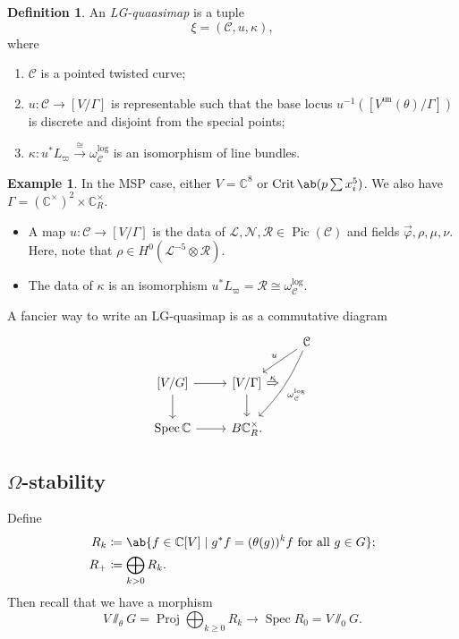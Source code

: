 \documentclass[10pt]{amsart}
\theoremstyle{definition}
\newtheorem{defn}[thm]{Definition}
\newtheorem{exm}[thm]{Example}
\theoremstyle{remark}
\theoremstyle{plain}
\theoremstyle{definition}
\theoremstyle{remark}
\newcommand{\C}{\mathbb{C}}
\newcommand{\mc}[1]{\mathcal{#1}}
\newcommand{\mr}[1]{\mathrm{#1}}
\newcommand{\on}[1]{\operatorname{#1}}
\newcommand{\1}{\mathbf{1}}
\newcommand{\2}{\mathbf{2}}
\newcommand{\3}{\mathbf{3}}
\DeclareMathOperator{\Pic}{Pic}
\DeclareMathOperator{\Spec}{Spec}
\DeclareMathOperator{\Proj}{Proj}
\begin{document}
\begin{defn}
    An \textit{LG-quaasimap} is a tuple
    \[ \xi = (\mc{C}, u, \kappa), \]
    where
    \begin{enumerate}
        \item $\mc{C}$ is a pointed twisted curve;
        \item $u \colon \mc{C} \to [V/\Gamma]$ is representable such that the base locus $u^{-1}([V^{\mr{un}}(\theta)/\Gamma])$ is discrete and disjoint from the special points;
        \item $\kappa \colon u^* L_{\varpi} \xrightarrow{\cong} \omega_{\mc{C}}^{\log}$ is an isomorphism of line bundles.
    \end{enumerate}
\end{defn}

\begin{exm}
    In the MSP case, either $V = \C^8$ or $\on{Crit} \ab(p \sum x_i^5)$. We also have $\Gamma = (\C^{\times})^2 \times \C^{\times}_R$.
    \begin{itemize}
        \item A map $u \colon \mc{C} \to [V/\Gamma]$ is the data of $\mc{L}, \mc{N}, \mc{R} \in \Pic(\mc{C})$ and fields $\vec{ \varphi }, \rho, \mu, \nu$. Here, note that $\rho \in H^0(\mc{L}^{-5} \otimes \mc{R})$.
        \item The data of $\kappa$ is an isomorphism $u^* L_{\varpi} = \mc{R} \cong \omega_{\mc{C}}^{\log}$.
    \end{itemize}
\end{exm}

A fancier way to write an LG-quasimap is as a commutative diagram
\begin{equation*}
\begin{tikzcd}
    & & \mc{C} \ar[swap]{dl}{u} \ar[bend left=10,""{swap,name=F}]{ddl}{\omega_{\mc{C}}^{\log}} \\
    { [V/G] } \ar{r} \ar{d} & { [V/\Gamma] } \ar{d} \ar[Rightarrow,to=F,"\kappa"]  \\
    \Spec \C \ar{r} & B \C^{\times}_R.
\end{tikzcd}
\end{equation*}

\subsection{$\Omega$-stability}%
\label{sub:Omega-stability}

Define
\begin{align*}
    R_k &\coloneqq \ab\{ f \in \C[V] \mid g^* f = (\theta(g))^k f\text{ for all } g \in G \};\\
    R_+ &\coloneqq \bigoplus_{k >0} R_k.
\end{align*}
Then recall that we have a morphism
\[ V \sslash_{\theta} G = \Proj \bigoplus_{k \geq 0} R_k \to \Spec R_0 = V \sslash_0 G. \]
\end{document}
